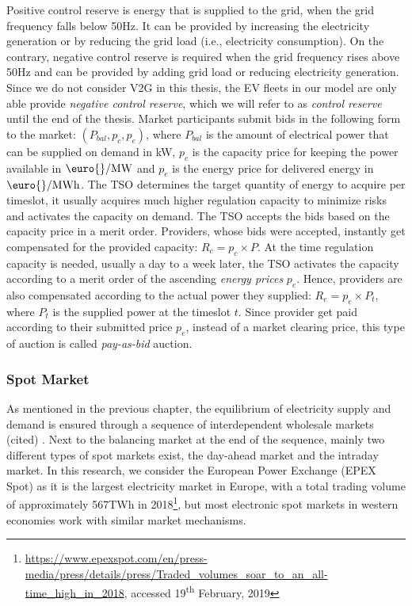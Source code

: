 \documentclass[a4paper, 12pt]{article}
\let\cite\shortcite
\begin{document}
Positive control reserve is energy that is supplied to the grid, when the grid
frequency falls below 50Hz. It can be provided by increasing the electricity
generation or by reducing the grid load (i.e., electricity consumption). On the
contrary, negative control reserve is required when the grid frequency rises
above 50Hz and can be provided by adding grid load or reducing electricity
generation. Since we do not consider V2G in this thesis, the EV fleets in our
model are only able provide \emph{negative control reserve}, which we will refer to
as \emph{control reserve} until the end of the thesis. Market participants submit
bids in the following form to the market: \((P_{bal}, p_c, p_e)\), where \(P_{bal}\)
is the amount of electrical power that can be supplied on demand in kW, \(p_c\) is
the capacity price for keeping the power available in \(\text{\euro{}/MW}\) and
\(p_e\) is the energy price for delivered energy in \(\text{\euro{}/MWh}\). The TSO
determines the target quantity of energy to acquire per timeslot, it usually
acquires much higher regulation capacity to minimize risks and activates the
capacity on demand. The TSO accepts the bids based on the capacity price in a
merit order. Providers, whose bids were accepted, instantly get compensated for
the provided capacity: \(R_c = p_c \times P\). At the time regulation capacity is
needed, usually a day to a week later, the TSO activates the capacity according
to a merit order of the ascending \emph{energy prices} \(p_e\). Hence, providers are
also compensated according to the actual power they supplied: \(R_e = p_e \times
P_t\), where \(P_t\) is the supplied power at the timeslot \(t\). Since provider get
paid according to their submitted price \(p_e\), instead of a market clearing
price, this type of auction is called \emph{pay-as-bid} auction.
\subsubsection{Spot Market \label{sec-spot-market}}
\label{sec:org47327c2}
As mentioned in the previous chapter, the equilibrium of electricity supply and
demand is ensured through a sequence of interdependent wholesale markets (cited)
\cite{pape16_are_fundam_enoug}. Next to the balancing market at the end of the
sequence, mainly two different types of spot markets exist, the day-ahead
market and the intraday market. In this research, we consider the European Power
Exchange (EPEX Spot) as it is the largest electricity market in Europe, with a
total trading volume of approximately 567TWh in 2018\footnote{\url{https://www.epexspot.com/en/press-media/press/details/press/Traded\_volumes\_soar\_to\_an\_all-time\_high\_in\_2018},
accessed 19\textsuperscript{th} February, 2019\label{orgff464d9}}, but most electronic
spot markets in western economies work with similar market mechanisms.
\end{document}
